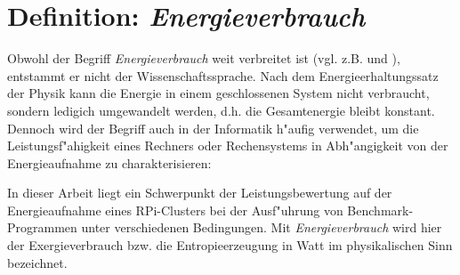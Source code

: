 %

\section{Definition: \textit{Energieverbrauch}}\label{Energieverbrauch}

Obwohl der Begriff \textit{Energieverbrauch} weit verbreitet ist (vgl. z.B. \cite{fic13} und \cite{}), entstammt er nicht der Wissenschaftssprache. Nach dem Energieerhaltungssatz der Physik kann die Energie in einem geschlossenen System nicht verbraucht, sondern ledigich umgewandelt werden, d.h. die Gesamtenergie bleibt konstant. Dennoch wird der Begriff auch in der Informatik h"aufig verwendet, um die Leistungsf"ahigkeit eines Rechners oder Rechensystems in Abh"angigkeit von der Energieaufnahme zu charakterisieren:
\begin{quote}
\onehalfspacing
\end{quote}
In dieser Arbeit liegt ein Schwerpunkt der Leistungsbewertung auf der Energieaufnahme eines RPi-Clusters bei der Ausf"uhrung von Benchmark-Programmen unter verschiedenen Bedingungen. Mit \textit{Energieverbrauch} wird hier der Exergieverbrauch bzw. die Entropieerzeugung in Watt im physikalischen Sinn bezeichnet.     

